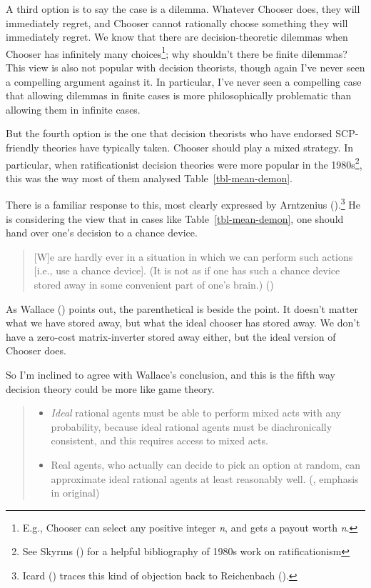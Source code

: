 \documentclass[
  10pt,
  letterpaper,
  DIV=11,
  numbers=noendperiod,
  twoside]{scrartcl}
\providecommand{\tightlist}{%
  \setlength{\itemsep}{0pt}\setlength{\parskip}{0pt}}\usepackage{longtable,booktabs,array}
\begin{document}
A third option is to say the case is a dilemma. Whatever Chooser does,
they will immediately regret, and Chooser cannot rationally choose
something they will immediately regret. We know that there are
decision-theoretic dilemmas when Chooser has infinitely many
choices\footnote{E.g., Chooser can select any positive integer \emph{n},
  and gets a payout worth \emph{n}.}; why shouldn't there be finite
dilemmas? This view is also not popular with decision theorists, though
again I've never seen a compelling argument against it. In particular,
I've never seen a compelling case that allowing dilemmas in finite cases
is more philosophically problematic than allowing them in infinite
cases.

But the fourth option is the one that decision theorists who have
endorsed SCP-friendly theories have typically taken. Chooser should play
a mixed strategy. In particular, when ratificationist decision theories
were more popular in the 1980s\footnote{See Skyrms
  () for a helpful bibliography
  of 1980s work on ratificationism}, this was the way most of them
analysed Table~\ref{tbl-mean-demon}.

There is a familiar response to this, most clearly expressed by
Arntzenius ().\footnote{Icard
  () traces this kind of objection back to
  Reichenbach ().} He is considering
the view that in cases like Table~\ref{tbl-mean-demon}, one should hand
over one's decision to a chance device.

\begin{quote}
{[}W{]}e are hardly ever in a situation in which we can perform such
actions {[}i.e., use a chance device{]}. (It is not as if one has such a
chance device stored away in some convenient part of one's brain.)
()
\end{quote}

As Wallace () points out, the
parenthetical is beside the point. It doesn't matter what we have stored
away, but what the ideal chooser has stored away. We don't have a
zero-cost matrix-inverter stored away either, but the ideal version of
Chooser does.

So I'm inclined to agree with Wallace's conclusion, and this is the
fifth way decision theory could be more like game theory.

\begin{quote}
\begin{itemize}
\tightlist
\item
  \emph{Ideal} rational agents must be able to perform mixed acts with
  any probability, because ideal rational agents must be diachronically
  consistent, and this requires access to mixed acts.\\
\item
  Real agents, who actually can decide to pick an option at random, can
  approximate ideal rational agents at least reasonably well.
  (, emphasis in
  original)
\end{itemize}
\end{quote}
\end{document}
